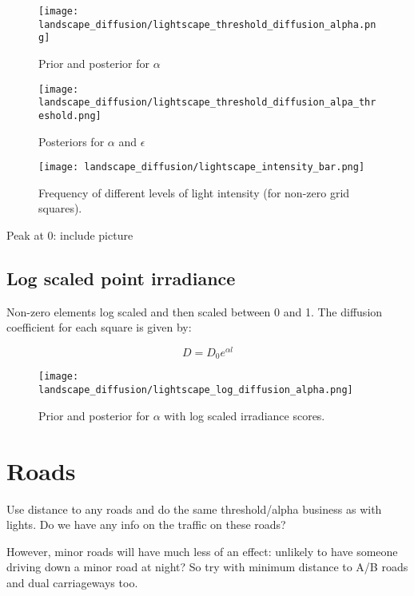 \begin{figure} [h]
    \centering
    \texttt{[image: landscape\_diffusion/lightscape\_threshold\_diffusion\_alpha.png]}
    \label{fig:alpha_threshold}
    \caption{Prior and posterior for $\alpha$}
\end{figure}

\begin{figure} [h]
    \centering
    \texttt{[image: landscape\_diffusion/lightscape\_threshold\_diffusion\_alpa\_threshold.png]}
    \label{fig:}
    \caption{Posteriors for $\alpha$ and $\epsilon$}
\end{figure}

\begin{figure} [h]
    \centering
    \texttt{[image: landscape\_diffusion/lightscape\_intensity\_bar.png]}
    \label{fig:nnz_frequency}
    \caption{Frequency of different levels of light intensity (for non-zero grid squares).}


\end{figure}

Peak at 0: include picture


\pagebreak
\pagebreak
\pagebreak

\subsection{Log scaled point irradiance}

Non-zero elements log scaled and then scaled between 0 and 1.  
The diffusion coefficient for each square is given by:

$$D = D_0 e^{\alpha l} $$ 

\begin{figure} [h]
    \centering
    \texttt{[image: landscape\_diffusion/lightscape\_log\_diffusion\_alpha.png]}
    \label{fig:log_diffusion}
    \caption{Prior and posterior for $\alpha$ with log scaled irradiance scores.}
\end{figure}   






\section{Roads}

Use distance to any roads and do the same threshold/alpha business as with
lights. Do we have any info on the traffic on these roads?

However, minor roads will have much less of an effect: unlikely to have someone
driving down a minor road at night? So try with minimum distance to A/B roads
and dual carriageways too. 
